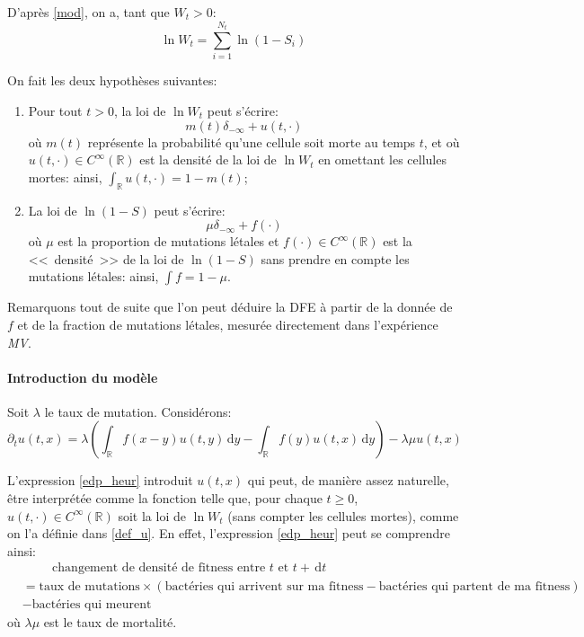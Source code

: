 \documentclass[12pt]{article}
\newcounter{prop}[section]
\newcommand{\pth}[1]{\left(#1\right)}
\newcommand{\esp}{\hspace{1cm}}
\newcommand{\Er}{\mathbb{R}}
\newcommand{\de}{\,\mathrm{d}}
\newcommand{\dr}{\partial}
\begin{document}
D'après \eqref{mod}, on a, tant que $W_t>0$: \[\ln W_t=\sum_{i=1}^{N_t}\ln(1-S_i)\]

On fait les deux hypothèses suivantes:
\begin{enumerate}
\item Pour tout $t>0$, la loi de $\ln W_t$ peut s'écrire:
  \begin{equation}\label{def_u} m(t)\delta_{-\infty}+u(t,\cdot)\end{equation}
  où $m(t)$ représente la probabilité qu'une cellule soit morte au temps $t$, et où $u(t,\cdot)\in C^{\infty}(\Er)$ est la densité de la loi de $\ln W_t$ en omettant les cellules mortes: ainsi, $\int_{\Er}u(t,\cdot)=1-m(t)$;
\item La loi de $\ln (1-S)$ peut s'écrire:
  \[\mu\delta_{-\infty}+f(\cdot)\]
  où $\mu$ est la proportion de mutations létales et $f(\cdot)
  \in C^{\infty}(\Er)$ est la <<~densité~>> de la loi de $\ln(1-S)$ sans prendre en compte les mutations létales: ainsi, $\int f=1-\mu$.
\end{enumerate}

Remarquons tout de suite que l'on peut déduire la DFE à partir de la donnée de $f$ et de la fraction de mutations létales, mesurée directement dans l'expérience \emph{MV}.

\paragraph{Introduction du modèle}

Soit $\lambda$ le taux de mutation. Considérons:
\begin{equation}\label{edp_heur} \dr_tu(t,x)=\lambda\pth{\int_{\Er}f(x-y)u(t,y)\de y-\int_{\Er}f(y)u(t,x)\de y}-\lambda\mu u(t,x)\end{equation}

L'expression \eqref{edp_heur} introduit $u(t,x)$ qui peut, de manière assez naturelle, être interprétée comme la fonction telle que, pour chaque $t\geqslant 0$, $u(t,\cdot)\in C^{\infty}(\Er)$ soit la loi de $\ln W_t$ (sans compter les cellules mortes), comme on l'a définie dans \eqref{def_u}. En effet, l'expression \eqref{edp_heur} peut se comprendre ainsi:
\begin{align*}
&\esp\text{changement de densité de fitness entre $t$ et $t+\de t$}\\
&=\text{taux de mutations}\times\pth{\text{bactéries qui arrivent sur ma fitness}-\text{bactéries qui partent de ma fitness}}\\
&-\text{bactéries qui meurent}
\end{align*} 
où $\lambda\mu$ est le taux de mortalité. 
\end{document}

